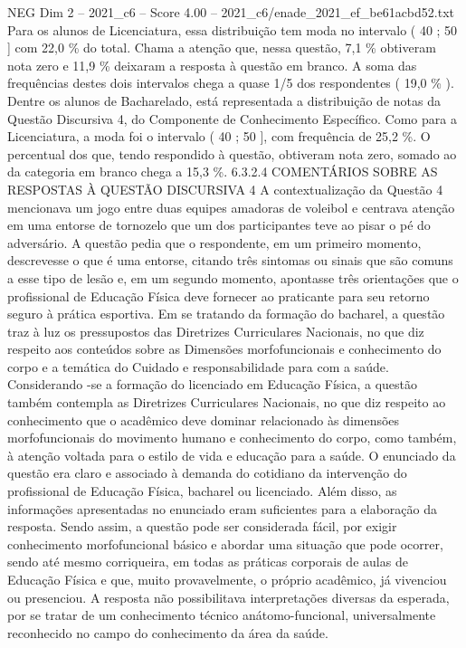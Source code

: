 \begin{textsample}{NEG Dim 2 – 2021\_c6 – Score 4.00 – 2021\_c6/enade\_2021\_ef\_be61acbd52.txt}
Para os alunos de Licenciatura, essa distribuição tem moda no intervalo ( 40 ; 50 ] com 22,0 \% do total.
Chama a atenção que, nessa questão, 7,1 \% obtiveram nota zero e 11,9 \% deixaram a resposta à questão em branco.
A soma das frequências destes dois intervalos chega a quase 1/5 dos respondentes ( 19,0 \% ).
Dentre os alunos de Bacharelado, está representada a distribuição de notas da Questão Discursiva 4, do Componente de Conhecimento Específico.
Como para a Licenciatura, a moda foi o intervalo ( 40 ; 50 ], com frequência de 25,2 \%.
O percentual dos que, tendo respondido à questão, obtiveram nota zero, somado ao da categoria em branco chega a 15,3 \%. 6.3.2.4 COMENTÁRIOS SOBRE AS RESPOSTAS À QUESTÃO DISCURSIVA 4 A contextualização da Questão 4 mencionava um jogo entre duas equipes amadoras de voleibol e centrava atenção em uma entorse de tornozelo que um dos participantes teve ao pisar o pé do adversário.
A questão pedia que o respondente, em um primeiro momento, descrevesse o que é uma entorse, citando três sintomas ou sinais que são comuns a esse tipo de lesão e, em um segundo momento, apontasse três orientações que o profissional de Educação Física deve fornecer ao praticante para seu retorno seguro à prática esportiva.
Em se tratando da formação do bacharel, a questão traz à luz os pressupostos das Diretrizes Curriculares Nacionais, no que diz respeito aos conteúdos sobre as Dimensões morfofuncionais e conhecimento do corpo e a temática do Cuidado e responsabilidade para com a saúde.
Considerando -se a formação do licenciado em Educação Física, a questão também contempla as Diretrizes Curriculares Nacionais, no que diz respeito ao conhecimento que o acadêmico deve dominar relacionado às dimensões morfofuncionais do movimento humano e conhecimento do corpo, como também, à atenção voltada para o estilo de vida e educação para a saúde.
O enunciado da questão era claro e associado à demanda do cotidiano da intervenção do profissional de Educação Física, bacharel ou licenciado.
Além disso, as informações apresentadas no enunciado eram suficientes para a elaboração da resposta.
Sendo assim, a questão pode ser considerada fácil, por exigir conhecimento morfofuncional básico e abordar uma situação que pode ocorrer, sendo até mesmo corriqueira, em todas as práticas corporais de aulas de Educação Física e que, muito provavelmente, o próprio acadêmico, já vivenciou ou presenciou.
A resposta não possibilitava interpretações diversas da esperada, por se tratar de um conhecimento técnico anátomo-funcional, universalmente reconhecido no campo do conhecimento da área da saúde.

\end{textsample}
